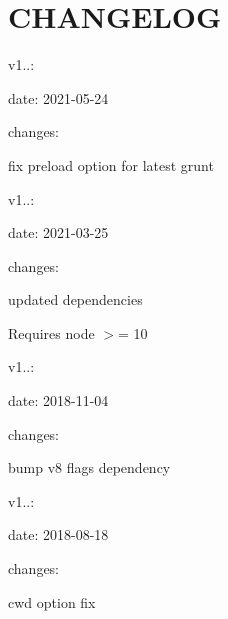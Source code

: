 \chapter{CHANGELOG}
\hypertarget{md__c_1_2_users_2_s_t_r_i_d_e_r_2source_2repos_2_ainslie_a_p_i_2wwwroot_2lib_2jquery-ui_2node__mc68f131496bfd631b79d74b436ac66af}{}\label{md__c_1_2_users_2_s_t_r_i_d_e_r_2source_2repos_2_ainslie_a_p_i_2wwwroot_2lib_2jquery-ui_2node__mc68f131496bfd631b79d74b436ac66af}

\begin{DoxyItemize}
\item v1..\+:
\end{DoxyItemize}

date\+: 2021-\/05-\/24
\begin{DoxyItemize}
\item changes\+:
\begin{DoxyItemize}
\item fix preload option for latest grunt
\end{DoxyItemize}
\end{DoxyItemize}

v1..\+:
\begin{DoxyItemize}
\item date\+: 2021-\/03-\/25
\item changes\+:
\begin{DoxyItemize}
\item updated dependencies
\item Requires node \texorpdfstring{$>$}{>}= 10
\end{DoxyItemize}
\end{DoxyItemize}

v1..\+:
\begin{DoxyItemize}
\item date\+: 2018-\/11-\/04
\item changes\+:
\begin{DoxyItemize}
\item bump v8 flags dependency
\end{DoxyItemize}
\end{DoxyItemize}

v1..\+:
\begin{DoxyItemize}
\item date\+: 2018-\/08-\/18
\item changes\+:
\begin{DoxyItemize}
\item cwd option fix
\end{DoxyItemize}
\end{DoxyItemize}

